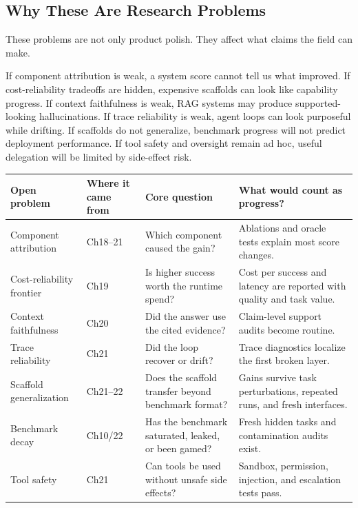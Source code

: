 \subsection{Why These Are Research Problems}

These problems are not only product polish. They affect what claims the field can make.

If component attribution is weak, a system score cannot tell us what improved. If cost-reliability tradeoffs are hidden, expensive scaffolds can look like capability progress. If context faithfulness is weak, RAG systems may produce supported-looking hallucinations. If trace reliability is weak, agent loops can look purposeful while drifting. If scaffolds do not generalize, benchmark progress will not predict deployment performance. If tool safety and oversight remain ad hoc, useful delegation will be limited by side-effect risk.

\begin{center}
\small
\begin{tabularx}{\textwidth}{@{}p{}p{}p{}X@{}}
\toprule
\textbf{Open problem} & \textbf{Where it came from} & \textbf{Core question} & \textbf{What would count as progress?} \\
\midrule
Component attribution & Ch18--21 & Which component caused the gain? & Ablations and oracle tests explain most score changes. \\
Cost-reliability frontier & Ch19 & Is higher success worth the runtime spend? & Cost per success and latency are reported with quality and task value. \\
Context faithfulness & Ch20 & Did the answer use the cited evidence? & Claim-level support audits become routine. \\
Trace reliability & Ch21 & Did the loop recover or drift? & Trace diagnostics localize the first broken layer. \\
Scaffold generalization & Ch21--22 & Does the scaffold transfer beyond benchmark format? & Gains survive task perturbations, repeated runs, and fresh interfaces. \\
Benchmark decay & Ch10/22 & Has the benchmark saturated, leaked, or been gamed? & Fresh hidden tasks and contamination audits exist. \\
Tool safety & Ch21 & Can tools be used without unsafe side effects? & Sandbox, permission, injection, and escalation tests pass. \\
\bottomrule
\end{tabularx}
\end{center}

